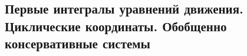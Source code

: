 

\subsection{Первые интегралы уравнений движения. Циклические координаты. Обобщенно консервативные системы}



